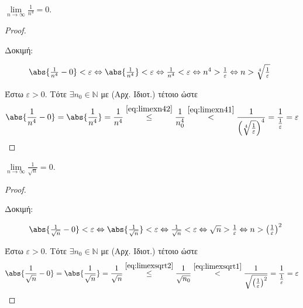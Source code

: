 \documentclass[main.tex]{subfiles}
\begin{document}
\begin{examples}
\begin{enumerate}[i)]
        \item $ \lim\limits_{n \to \infty} \frac{1}{n^{4}} = 0 $. 
            \begin{proof}
            \item {}
                \begin{description}
                    \item[Δοκιμή:]$ \abs{\frac{1}{n^{4}} - 0} < \varepsilon 
                        \Leftrightarrow \abs{\frac{1}{n^{4}}} < \varepsilon 
                        \Leftrightarrow \frac{1}{n^{4}} < \varepsilon
                        \Leftrightarrow n^{4} > \frac{1}{\varepsilon}
                        \Leftrightarrow n > \sqrt[4]{\frac{1}{\varepsilon}}$
                \end{description}
                Έστω $ \varepsilon >0 $. Τότε $ \exists n_{0}  \in 
                \mathbb{N}$ με  (Αρχ. Ιδιοτ.)
                τέτοιο ώστε  
                \[
                    \abs{\frac{1}{n^{4}} - 0 } = \abs{\frac{1}{n^{4}}} 
                    = \frac{1}{n^{4}} \overset{\eqref{eq:limexn42}}\leq 
                    \frac{1}{n_{0}^{4}} \overset{\eqref{eq:limexn41}}{<}
                    \frac{1}{\left(\sqrt[4]{\frac{1}{\varepsilon}
                    }\right)^{4}} = \frac{1}{\frac{1}{\varepsilon}} =  
                    \varepsilon
                \] 
            \end{proof}

        \item $ \lim\limits_{n \to \infty} \frac{1}{\sqrt{n}} = 0$.
            \begin{proof}
            \item {}
                \begin{description}
                    \item[Δοκιμή:] $ \abs{\frac{1}{\sqrt{n}}-0 } 
                        < \varepsilon 
                        \Leftrightarrow \abs{\frac{1}{\sqrt{n}} } < 
                        \varepsilon 
                        \Leftrightarrow \frac{1}{\sqrt{n}} < 
                        \varepsilon \Leftrightarrow \sqrt{n} >
                        \frac{1}{\varepsilon} \Leftrightarrow n >
                        \left(\frac{1}{\varepsilon}\right)^{2}
                        $
                \end{description}
                Έστω $ \varepsilon > 0 $. Τότε $ \exists n_{0} \in 
                \mathbb{N} $
                με  (Αρχ. Ιδιοτ.) τέτοιο ώστε 
\[
    \abs{\frac{1}{\sqrt{n}} -0} = \abs{\frac{1}{\sqrt{n}}} =
    \frac{1}{\sqrt{n}} \overset{\eqref{eq:limexsqrt2}}{\leq}
    \frac{1}{\sqrt{n_{0}}} \overset{\eqref{eq:limexsqrt1}}{<}
    \frac{1}{\sqrt{\left(\frac{1}{\varepsilon}\right)^{2}}} =
    \frac{1}{\frac{1}{\varepsilon}} = \varepsilon
 \] 
            \end{proof}


\end{enumerate}
\end{examples}
\end{document}
